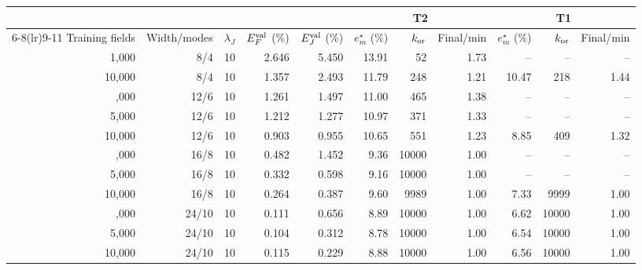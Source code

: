 \begin{tabular}{rrcrr@{\hspace{8pt}}rrr@{\hspace{8pt}}rrr}
\toprule
 & & & & & \multicolumn{3}{c}{T2} & \multicolumn{3}{c}{T1} \\
\cmidrule(lr){6-8}\cmidrule(lr){9-11}
Training fields & Width/modes & $\lambda_J$ & $E_F^{\rm val}$ (\%) & $E_J^{\rm val}$ (\%) & $e_m^\star$ (\%) & $k_{\rm or}$ & Final/min & $e_m^\star$ (\%) & $k_{\rm or}$ & Final/min \\
\midrule
1,000 & 8/4 & 10 & 2.646 & 5.450 & 13.91 & 52 & 1.73 & -- & -- & -- \\
10,000 & 8/4 & 10 & 1.357 & 2.493 & 11.79 & 248 & 1.21 & 10.47 & 218 & 1.44 \\
\addlinespace
1,000 & 12/6 & 10 & 1.261 & 1.497 & 11.00 & 465 & 1.38 & -- & -- & -- \\
5,000 & 12/6 & 10 & 1.212 & 1.277 & 10.97 & 371 & 1.33 & -- & -- & -- \\
10,000 & 12/6 & 10 & 0.903 & 0.955 & 10.65 & 551 & 1.23 & 8.85 & 409 & 1.32 \\
\addlinespace
1,000 & 16/8 & 10 & 0.482 & 1.452 & 9.36 & 10000 & 1.00 & -- & -- & -- \\
5,000 & 16/8 & 10 & 0.332 & 0.598 & 9.16 & 10000 & 1.00 & -- & -- & -- \\
10,000 & 16/8 & 10 & 0.264 & 0.387 & 9.60 & 9989 & 1.00 & 7.33 & 9999 & 1.00 \\
\addlinespace
1,000 & 24/10 & 10 & 0.111 & 0.656 & 8.89 & 10000 & 1.00 & 6.62 & 10000 & 1.00 \\
5,000 & 24/10 & 10 & 0.104 & 0.312 & 8.78 & 10000 & 1.00 & 6.54 & 10000 & 1.00 \\
10,000 & 24/10 & 10 & 0.115 & 0.229 & 8.88 & 10000 & 1.00 & 6.56 & 10000 & 1.00 \\
\bottomrule
\end{tabular}
